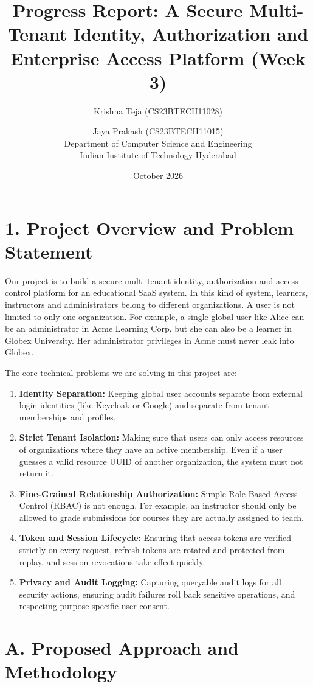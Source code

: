 \documentclass{article}
\title{\textbf{Progress Report: A Secure Multi-Tenant Identity, Authorization and Enterprise Access Platform (Week 3)}}
\author{Krishna Teja (CS23BTECH11028) \and Jaya Prakash (CS23BTECH11015) \\ Department of Computer Science and Engineering \\ Indian Institute of Technology Hyderabad}
\date{October 2026}
\begin{document}
\maketitle

\section*{1. Project Overview and Problem Statement}
Our project is to build a secure multi-tenant identity, authorization and access control platform for an educational SaaS system. In this kind of system, learners, instructors and administrators belong to different organizations. A user is not limited to only one organization. For example, a single global user like Alice can be an administrator in Acme Learning Corp, but she can also be a learner in Globex University. Her administrator privileges in Acme must never leak into Globex.

The core technical problems we are solving in this project are:
\begin{enumerate}
    \item \textbf{Identity Separation:} Keeping global user accounts separate from external login identities (like Keycloak or Google) and separate from tenant memberships and profiles.
    \item \textbf{Strict Tenant Isolation:} Making sure that users can only access resources of organizations where they have an active membership. Even if a user guesses a valid resource UUID of another organization, the system must not return it.
    \item \textbf{Fine-Grained Relationship Authorization:} Simple Role-Based Access Control (RBAC) is not enough. For example, an instructor should only be allowed to grade submissions for courses they are actually assigned to teach.
    \item \textbf{Token and Session Lifecycle:} Ensuring that access tokens are verified strictly on every request, refresh tokens are rotated and protected from replay, and session revocations take effect quickly.
    \item \textbf{Privacy and Audit Logging:} Capturing queryable audit logs for all security actions, ensuring audit failures roll back sensitive operations, and respecting purpose-specific user consent.
\end{enumerate}

\section*{A. Proposed Approach and Methodology}
\end{document}
